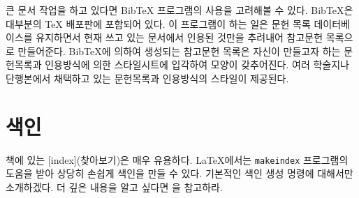 
큰 문서 작업을 하고 있다면 Bib\TeX{} 프로그램의 사용을 고려해볼 수 있다.
Bib\TeX 은 대부분의 \TeX{} 배포판에 포함되어 있다. 이 프로그램이 하는 일은 
문헌 목록 데이터베이스를 유지하면서 현재 쓰고 있는 문서에서 인용된 것만을 추려내어 
참고문헌 목록으로 만들어준다.
Bib\TeX 에 의하여 생성되는 참고문헌 목록은 자신이 만들고자 하는 문헌목록과 
인용방식에 의한 스타일시트에 입각하여 모양이 갖추어진다. 여러 학술지나 단행본에서 
채택하고 있는 문헌목록과 인용방식의 스타일이 제공된다.

\section{색인}
\label{sec:indexing}

책에 있는 [index](찾아보기)은 매우 유용하다. \LaTeX 에서는 \texttt{makeindex} 프로그램의 도움을 받아 상당히 손쉽게 색인을 만들 수 있다.
기본적인 색인 생성 명령에 대해서만 소개하겠다. 더 깊은 내용을 알고 싶다면 \companion 을 참고하라.

